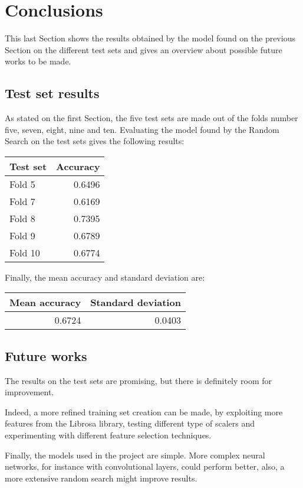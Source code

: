\section{Conclusions}
\label{results}

This last Section shows the results obtained by the model found 
on the previous Section on the different test sets and
gives an overview about possible future works to be made.

\subsection{Test set results}
As stated on the first Section, the five test sets are made out of the 
folds number five, seven, eight, nine and ten.
Evaluating the model found by the Random Search on the test sets 
gives the following results: 

\begin{center}
    \begin{tabular}{ |l|r| } 
        \hline
        Test set & Accuracy\\
        \hline
        Fold 5 & 0.6496 \\
        Fold 7 & 0.6169 \\
        Fold 8 & 0.7395 \\
        Fold 9 & 0.6789 \\
        Fold 10 & 0.6774 \\ 
        \hline
    \end{tabular}
\end{center}

Finally, the mean accuracy and standard deviation are: 
\begin{center}
    \begin{tabular}{ |r|r| } 
        \hline
        Mean accuracy & Standard deviation\\
        \hline
        0.6724 & 0.0403 \\
        \hline
    \end{tabular}
\end{center}

\subsection{Future works}

The results on the test sets are promising, but there is definitely 
room for improvement.

Indeed, a more refined training set creation can be made, by exploiting 
more features from the Librosa library, testing different type 
of scalers and experimenting with different feature selection 
techniques.

Finally, the models used in the project are simple. More complex 
neural networks, for instance with convolutional layers, could 
perform better, also, a more extensive random search might improve
results.